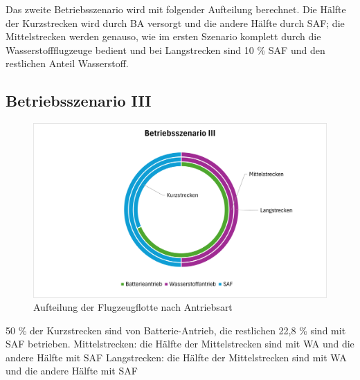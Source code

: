 Das zweite Betriebsszenario wird mit folgender Aufteilung berechnet. 
Die Hälfte der Kurzstrecken wird durch BA versorgt und die andere Hälfte durch SAF; 
die Mittelstrecken werden genauso, wie im ersten Szenario komplett durch die Wasserstoffflugzeuge bedient und 
bei Langstrecken sind 10 \% SAF und den restlichen Anteil Wasserstoff.

\subsection{Betriebsszenario III}
\begin{figure}[h]
	\centering
	\includegraphics[width=0.8\linewidth]{Bilder/BetriebsszenarioIII.png}
	\caption[Betriebsszenario III]{Aufteilung der Flugzeugflotte nach Antriebsart}
	\label{betriebsszenario3}
\end{figure}
50 \% der Kurzstrecken sind von Batterie-Antrieb, die restlichen 22,8 \% sind mit SAF betrieben.
Mittelstrecken: die Hälfte der Mittelstrecken sind mit WA und die andere Hälfte mit SAF
Langstrecken: die Hälfte der Mittelstrecken sind mit WA und die andere Hälfte mit SAF

